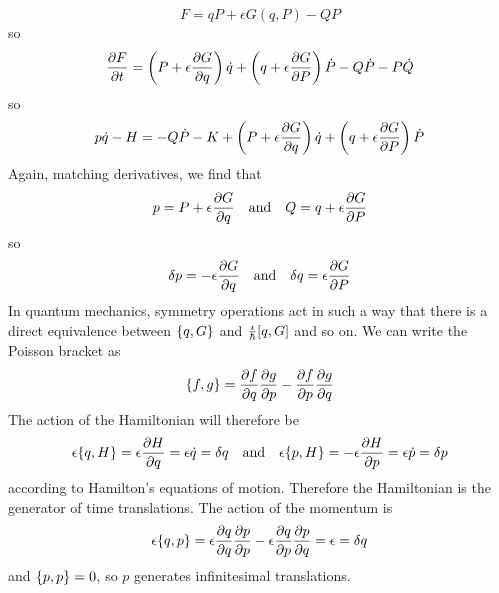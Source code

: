 \documentclass[a4paper,twoside]{article}
\begin{document}
\begin{itemize}
        \begin{problem}
            \begin{equation}
                F = qP + \epsilon G(q,P) - QP
            \end{equation}
            so
            \begin{equation}
                \pdv{F}{t} = \left( P + \epsilon \pdv{G}{q} \right)\dot{q} + \left( q + \epsilon \pdv{G}{P} \right)\dot{P} - Q\dot{P} - P\dot{Q}
            \end{equation}
            so
            \begin{equation}
                p\dot{q} - H = - Q\dot{P} - K + \left( P + \epsilon \pdv{G}{q} \right)\dot{q} + \left( q + \epsilon \pdv{G}{P} \right)\dot{P}
            \end{equation}
            Again, matching derivatives, we find that
            \begin{equation}
                p = P + \epsilon \pdv{G}{q} \qand Q = q + \epsilon \pdv{G}{P}
            \end{equation}
            so
            \begin{equation}
                \delta p = - \epsilon \pdv{G}{q} \qand \delta q = \epsilon \pdv{G}{P}
            \end{equation}
            In quantum mechanics, symmetry operations act in such a way that there is a direct equivalence between $ \pb{q}{G} $ and $ \frac{\imath}{\hbar} \comm{q}{G} $ and so on. We can write the Poisson bracket as
            \begin{equation}
                \pb{f}{g} = \pdv{f}{q} \pdv{g}{p} - \pdv{f}{p} \pdv{g}{q}
            \end{equation}
            The action of the Hamiltonian will therefore be
            \begin{align}
                \epsilon \pb{q}{H} = \epsilon \pdv{H}{q} = \epsilon \dot{q} = \delta q \qand \epsilon \pb{p}{H} = - \epsilon \pdv{H}{p} = \epsilon \dot{p} = \delta p
            \end{align}
            according to Hamilton's equations of motion. Therefore the Hamiltonian is the generator of time translations. The action of the momentum is
            \begin{equation}
                \epsilon \pb{q}{p} = \epsilon \pdv{q}{q} \pdv{p}{p} - \epsilon \pdv{q}{p} \pdv{p}{q} = \epsilon = \delta q
            \end{equation}
            and $ \pb{p}{p} = 0 $, so $ p $ generates infinitesimal translations.

\end{problem}
\end{itemize}
\end{document}

